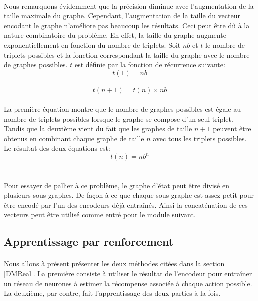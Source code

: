 \paragraph{}Nous remarquons évidemment que la précision diminue avec l'augmentation de la taille maximale du graphe. Cependant, l'augmentation de la taille du vecteur encodant le graphe n'améliore pas beaucoup les résultats. Ceci peut être dû à la nature combinatoire du problème. En effet, la taille du graphe augmente exponentiellement en fonction du nombre de triplets. Soit $nb$ et $t$ le nombre de triplets possibles et la fonction correspondant la taille du graphe avec le nombre de graphes possibles. $t$ est définie par la fonction de récurrence suivante:
\[t(1) = nb\]\\
\[t(n+1) = t(n) \times nb\]
\paragraph{}La première équation montre que le nombre de graphes possibles est égale au nombre de triplets possibles lorsque le graphe se compose d'un seul triplet. Tandis que la deuxième vient du fait que les graphes de taille $n+1$ peuvent être obtenus en combinant chaque graphe de taille $n$ avec tous les triplets possibles. Le résultat des deux équations est:
\[t(n) = nb^n\]\\
\paragraph{}Pour essayer de pallier à ce problème, le graphe d'état peut être divisé en plusieurs sous-graphes. De façon à ce que chaque sous-graphe est assez petit pour être encodé par l'un des encodeurs déjà entraînés. Ainsi la concaténation de ces vecteurs peut être utilisé comme entré pour le module suivant.
\subsection{Apprentissage par renforcement}
\paragraph{}Nous allons à présent présenter les deux méthodes citées dans la section \ref{DMReal}. La première consiste à utiliser le résultat de l'encodeur pour entraîner un réseau de neurones à estimer la récompense associée à chaque action possible. La deuxième, par contre, fait l'apprentissage des deux parties à la fois.
